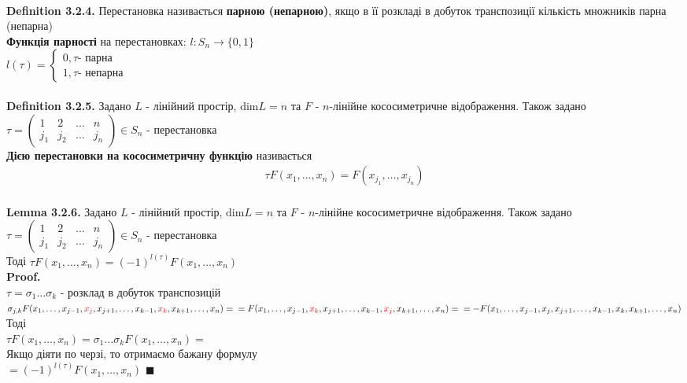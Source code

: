 \documentclass[a4paper, 14pt]{extarticle}
\def\defin#1{\textbf{Definition {#1}}}
\def\lm#1{\textbf{Lemma {#1}}}
\def\proof{\textbf{Proof.}\\}
\def\bigline{\vspace{5mm}\\}
\def\qed{$\blacksquare$}
\def\dim#1{\textrm{dim} {#1}}
\begin{document}
	\bigline
	\defin{3.2.4.} Перестановка називається \textbf{парною (непарною)}, якщо в її розкладі в добуток транспозиції кількість множників парна (непарна)
	\bigline
	\textbf{Функція парності} на перестановках: $l: S_n \to \{0,1\}$\\
	$l(\tau) = \begin{cases} 0, \tau \textrm{- парна} \\ 1, \tau \textrm{- непарна} \end{cases}$\\
	\bigline
	\defin{3.2.5.} Задано $L$ - лінійний простір, $\dim L = n$ та $F$ - $n$-лінійне кососиметричне відображення. Також задано $\tau = \begin{pmatrix} 1 & 2 & \dots & n \\
	j_1 & j_2 & \dots & j_n
\end{pmatrix}	 \in S_n$ - перестановка\\
\textbf{Дією перестановки на кососиметричну функцію} називається
\begin{align*}
\tau F(x_1,\dots,x_n) = F(x_{j_1},\dots,x_{j_n})
\end{align*}
\\
\lm{3.2.6.} Задано $L$ - лінійний простір, $\dim L = n$ та $F$ - $n$-лінійне кососиметричне відображення. Також задано $\tau = \begin{pmatrix} 1 & 2 & \dots & n \\
	j_1 & j_2 & \dots & j_n
\end{pmatrix}	 \in S_n$ - перестановка\\
Тоді $\tau F(x_1,\dots, x_n) = (-1)^{l(\tau)}F(x_1,\dots,x_n)$\\
\proof
$\tau = \sigma_1 \dots \sigma_k$ - розклад в добуток транспозицій\\
$\sigma_{j,k}F(x_1,\dots,x_{j-1},\textcolor{red}{x_j},x_{j+1},\dots,x_{k-1},\textcolor{red}{x_k},x_{k+1},\dots,x_n) = \\ = F(x_1,\dots,x_{j-1},\textcolor{red}{x_k},x_{j+1},\dots,x_{k-1},\textcolor{red}{x_j},x_{k+1},\dots,x_n) = \\ = -F(x_1,\dots,x_{j-1},x_j,x_{j+1},\dots,x_{k-1},x_k,x_{k+1},\dots,x_n)$\\
Тоді\\
$\tau F(x_1,\dots,x_n) = \sigma_1 \dots \sigma_k F(x_1,\dots,x_n) \boxed{=}$\\
Якщо діяти по черзі, то отримаємо бажану формулу\\
$\boxed{=} (-1)^{l(\tau)}F(x_1,\dots,x_n)$ \qed
\bigline
\\
\\
\end{document}
